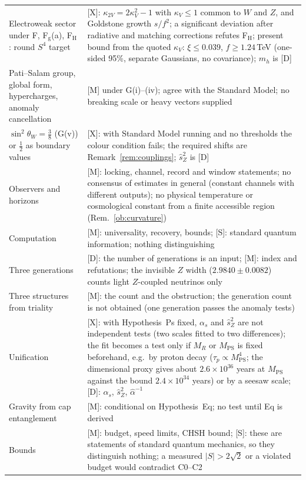 \documentclass[aps,pra,onecolumn,superscriptaddress,nofootinbib,10pt]{revtex4-2}
\theoremstyle{definition}
\theoremstyle{remark}
\begin{document}
\begin{table}[h]
\begin{tabular}{@{}p{}p{}@{}}
Electroweak sector under F, F$_{\mathrm g}$(a), F$_{\mathrm H}$: round $S^4$ target & [X]: $\kappa_{2V}=2\kappa_V^2-1$ with $\kappa_V\le1$ common to $W$ and $Z$, and Goldstone growth $s/f^2$; a significant deviation after radiative and matching corrections refutes F$_{\mathrm H}$; present bound from the quoted $\kappa_V$: $\xi\le0.039$, $f\ge1.24$\,TeV (one-sided 95\%, separate Gaussians, no covariance); $m_h$ is [D]\\
Pati--Salam group, global form, hypercharges, anomaly cancellation & [M] under G(i)--(iv); agree with the Standard Model; no breaking scale or heavy vectors supplied\\
$\sin^2\theta_W=\tfrac38$ (G(v)) or $\tfrac12$ as boundary values & [X]: with Standard Model running and no thresholds the colour condition fails; the required shifts are Remark~\ref{rem:couplings}; $\hat s_Z^2$ is [D]\\
Observers and horizons & [M]: locking, channel, record and window statements; no consensus of estimates in general (constant channels with different outputs); no physical temperature or cosmological constant from a finite accessible region (Rem.~\ref{ob:curvature})\\
Computation & [M]: universality, recovery, bounds; [S]: standard quantum information; nothing distinguishing\\
Three generations & [D]: the number of generations is an input; [M]: index and refutations; the invisible $Z$ width ($2.9840\pm0.0082$) counts light $Z$-coupled neutrinos only\\
Three structures from triality & [M]: the count and the obstruction; the generation count is not obtained (one generation passes the anomaly tests)\\
Unification & [X]: with Hypothesis~Ps fixed, $\alpha_s$ and $\hat s_Z^2$ are not independent tests (two scales fitted to two differences); the fit becomes a test only if $M_R$ or $M_{\mathrm{PS}}$ is fixed beforehand, e.g.\ by proton decay ($\tau_p\propto M_{\mathrm{PS}}^4$; the dimensional proxy gives about $2.6\times10^{36}$ years at $M_{\mathrm{PS}}$ against the bound $2.4\times10^{34}$ years) or by a seesaw scale; [D]: $\alpha_s$, $\hat s_Z^2$, $\hat\alpha^{-1}$\\
Gravity from cap entanglement & [M]: conditional on Hypothesis~Eq; no test until Eq is derived\\
Bounds & [M]: budget, speed limits, CHSH bound; [S]: these are statements of standard quantum mechanics, so they distinguish nothing; a measured $\lvert S\rvert>2\sqrt2$ or a violated budget would contradict C0--C2\\

\end{tabular}
\end{table}
\end{document}
